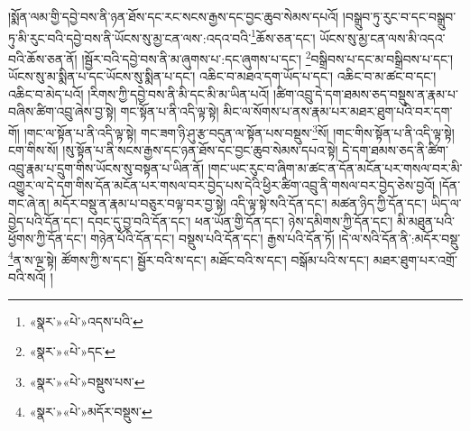 །སྨོན་ལམ་གྱི་དབྱེ་བས་ནི་ཉན་ཐོས་དང་རང་སངས་རྒྱས་དང་བྱང་ཆུབ་སེམས་དཔའོ། །བསྒྲུབ་ཏུ་རུང་བ་དང་བསྒྲུབ་ཏུ་མི་རུང་བའི་དབྱེ་བས་ནི་ཡོངས་སུ་མྱ་ངན་ལས་:འདའ་བའི་\footnote{«སྣར་»«པེ་»འདས་པའི་}ཆོས་ཅན་དང་། ཡོངས་སུ་མྱ་ངན་ལས་མི་འདའ་བའི་ཆོས་ཅན་ནོ། །སྦྱོར་བའི་དབྱེ་བས་ནི་མ་ཞུགས་པ་:དང་ཞུགས་པ་དང་། \footnote{«སྣར་»«པེ་»དང་}བསྒྲིབས་པ་དང་མ་བསྒྲིབས་པ་དང་། ཡོངས་སུ་མ་སྨིན་པ་དང་ཡོངས་སུ་སྨིན་པ་དང་། འཆིང་བ་མཐའ་དག་ཡོད་པ་དང་། འཆིང་བ་མ་ཚང་བ་དང་། འཆིང་བ་མེད་པའོ། །རིགས་ཀྱི་དབྱེ་བས་ནི་མི་དང་མི་མ་ཡིན་པའོ། །ཚིག་འབྲུ་དེ་དག་ཐམས་ཅད་བསྡུས་ན་རྣམ་པ་བཞིས་ཚིག་འབྲུ་ཞེས་བྱ་སྟེ། གང་སྟོན་པ་ནི་འདི་ལྟ་སྟེ། མིང་ལ་སོགས་པ་ནས་རྣམ་པར་མཐར་ཐུག་པའི་བར་དག་གོ། །གང་ལ་སྟོན་པ་ནི་འདི་ལྟ་སྟེ། གང་ཟག་ཉི་ཤུ་རྩ་བདུན་ལ་སྟོན་པས་བསྡུས་\footnote{«སྣར་»«པེ་»བསྡུས་པས་}སོ། །གང་གིས་སྟོན་པ་ནི་འདི་ལྟ་སྟེ། ངག་གིས་སོ། །སུ་སྟོན་པ་ནི་སངས་རྒྱས་དང་ཉན་ཐོས་དང་བྱང་ཆུབ་སེམས་དཔའ་སྟེ། དེ་དག་ཐམས་ཅད་ནི་ཚིག་འབྲུ་རྣམ་པ་དྲུག་གིས་ཡོངས་སུ་བསྟན་པ་ཡིན་ནོ། །གང་ཡང་རུང་བ་ཞིག་མ་ཚང་ན་དོན་མངོན་པར་གསལ་བར་མི་འགྱུར་ལ་དེ་དག་གིས་དོན་མངོན་པར་གསལ་བར་བྱེད་པས་དེའི་ཕྱིར་ཚིག་འབྲུ་ནི་གསལ་བར་བྱེད་ཅེས་བྱའོ། །དོན་གང་ཞེ་ན། མདོར་བསྡུ་ན་རྣམ་པ་བཅུར་བལྟ་བར་བྱ་སྟེ། འདི་ལྟ་སྟེ་སའི་དོན་དང་། མཚན་ཉིད་ཀྱི་དོན་དང་། ཡིད་ལ་བྱེད་པའི་དོན་དང་། དབང་དུ་བྱ་བའི་དོན་དང་། ཕན་ཡོན་གྱི་དོན་དང་། ཉེས་དམིགས་ཀྱི་དོན་དང་། མི་མཐུན་པའི་ཕྱོགས་ཀྱི་དོན་དང་། གཉེན་པོའི་དོན་དང་། བསྡུས་པའི་དོན་དང་། རྒྱས་པའི་དོན་ཏོ། །དེ་ལ་སའི་དོན་ནི་:མདོར་བསྡུ་\footnote{«སྣར་»«པེ་»མདོར་བསྡུས་}ན་ས་ལྔ་སྟེ། ཚོགས་ཀྱི་ས་དང་། སྦྱོར་བའི་ས་དང་། མཐོང་བའི་ས་དང་། བསྒོམ་པའི་ས་དང་། མཐར་ཐུག་པར་འགྲོ་བའི་སའོ། །
